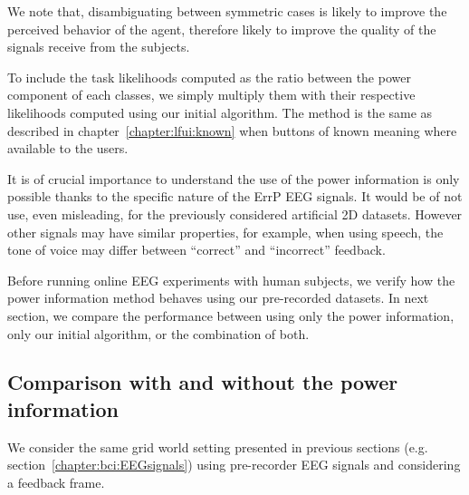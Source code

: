 We note that, disambiguating between symmetric cases is likely to improve the perceived behavior of the agent, therefore likely to improve the quality of the signals receive from the subjects. 




To include the task likelihoods computed as the ratio between the power component of each classes, we simply multiply them with their respective likelihoods computed using our initial algorithm. The method is the same as described in chapter~\ref{chapter:lfui:known} when buttons of known meaning where available to the users.




It is of crucial importance to understand the use of the power information is only possible thanks to the specific nature of the ErrP EEG signals. It would be of not use, even misleading, for the previously considered artificial 2D datasets. However other signals may have similar properties, for example, when using speech, the tone of voice may differ between ``correct'' and ``incorrect'' feedback.

Before running online EEG experiments with human subjects, we verify how the power information method behaves using our pre-recorded datasets. In next section, we compare the performance between using only the power information, only our initial algorithm, or the combination of both.

\subsection{Comparison with and without the power information}

We consider the same grid world setting presented in previous sections (e.g. section~\ref{chapter:bci:EEGsignals}) using pre-recorder EEG signals and considering a feedback frame.

